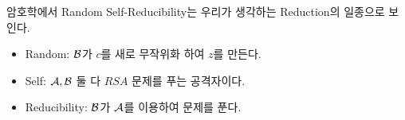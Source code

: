 \begin{memo}
    암호학에서 Random Self-Reducibility는 우리가 생각하는 Reduction의 일종으로
    보인다.
    \begin{itemize}
        \item Random: $\mathcal{B}$가 $c$를 새로 무작위화 하여 $z$를 만든다.
        \item Self: $\mathcal{A}, \mathcal{B}$ 둘 다 $RSA$ 문제를 푸는 공격자이다.
        \item Reducibility: $\mathcal{B}$가 $\mathcal{A}$를 이용하여 문제를 푼다.
    \end{itemize}
\end{memo}





